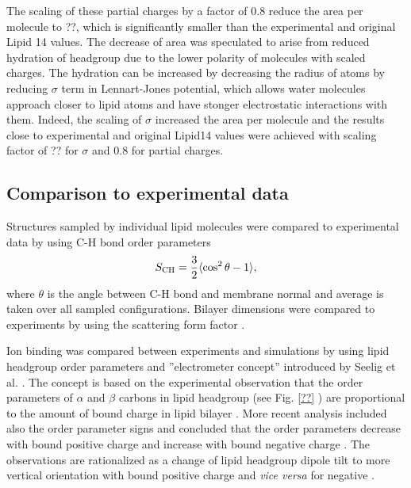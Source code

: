 \documentclass[aip,jcp,twocolumn]{revtex4}
\begin{document}
The scaling of these partial charges by a factor of 0.8 reduce the 
area per molecule to ??, which is significantly smaller than the
experimental and original Lipid 14 values.  
The decrease of area was speculated 
to arise from reduced hydration
of headgroup due to the lower polarity of molecules with scaled charges.
The hydration can be increased by decreasing the radius of atoms
by reducing $\sigma$ term in Lennart-Jones potential, which
allows water molecules approach closer to lipid atoms and
have stonger electrostatic interactions with them.
Indeed, the scaling of $\sigma$ increased the area per molecule
and the results close to experimental and original Lipid14 values were achieved
with scaling factor of ?? for $\sigma$ and 0.8 for partial charges.


\subsection{Comparison to experimental data}
Structures sampled by individual lipid molecules were compared
to experimental data by using C-H bond order parameters \cite{ollila16}
\begin{equation}
S_{\rm CH}=\frac{3}{2}\langle \cos^2\theta -1 \rangle,
\end{equation}
where $\theta$ is the angle between C-H bond and membrane
normal and average is taken over all sampled configurations.
Bilayer dimensions were compared to experiments by using the
scattering form factor \cite{ollila16}
. 

Ion binding was compared between experiments and simulations by 
using lipid headgroup order parameters and ''electrometer concept'' 
introduced by Seelig et al. \cite{seelig87,catte16}.
The concept is based on the experimental observation that the 
order parameters of $\alpha$ and $\beta$ carbons in lipid headgroup
(see Fig. \ref{??} 
) 
are proportional to the amount of bound charge
in lipid bilayer \cite{seelig87}. More recent analysis included also
the order parameter signs and concluded that the order parameters  
decrease with bound positive charge and increase with bound negative 
charge \cite{ollila16,catte16}. The observations are rationalized 
as a change of lipid headgroup dipole tilt to more vertical orientation
with bound positive charge and {\it vice versa} for negative \cite{seelig87}. 
\end{document}
